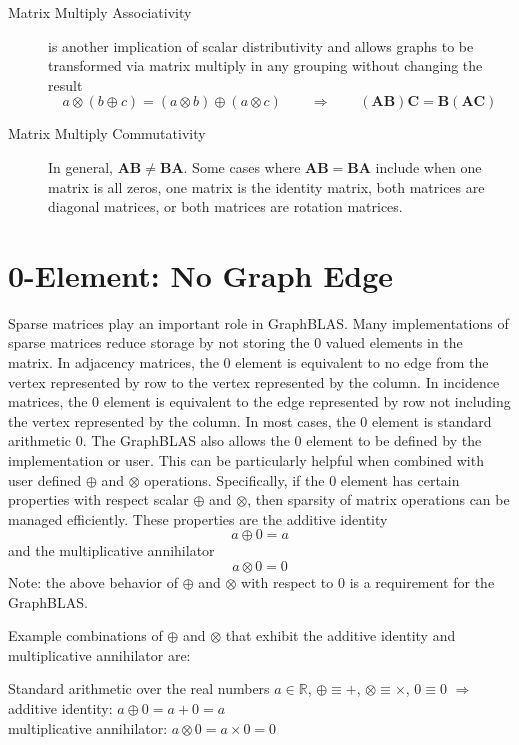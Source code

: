 \begin{description}
\item[Matrix Multiply Associativity] is another implication of scalar distributivity and allows graphs to be transformed via matrix multiply in any grouping without changing the result
  $$
      a \otimes (b \oplus c) = (a \otimes b) \oplus (a \otimes c)   ~~~~~~~~~ \Rightarrow ~~~~~~~~~
      (\mathbf{A} \mathbf{B}) \mathbf{C} = \mathbf{B} (\mathbf{A} \mathbf{C})
  $$
\item[Matrix Multiply Commutativity] In general, $\mathbf{A} \mathbf{B} \neq \mathbf{B} \mathbf{A}$.  Some cases where $\mathbf{A} \mathbf{B} = \mathbf{B} \mathbf{A}$ include when one matrix is all zeros, one matrix is the identity matrix, both matrices are diagonal matrices, or both matrices are rotation matrices.

\end{description}


\section{0-Element: No Graph Edge}
  Sparse matrices play an important role in GraphBLAS.  Many implementations of sparse matrices reduce storage by not storing the 0 valued elements in the matrix.  In adjacency matrices, the 0 element is equivalent to no edge from the vertex represented by row to the vertex represented by the column. In incidence matrices, the 0 element is equivalent to the edge represented by row not including the vertex represented by the column.  In most cases, the 0 element is standard arithmetic 0.  The GraphBLAS also allows the 0 element to be defined by the implementation or user.  This can be particularly helpful when combined with user defined $\oplus$ and $\otimes$ operations.  Specifically, if the 0 element has certain properties with respect scalar $\oplus$ and $\otimes$, then sparsity of matrix operations can be managed efficiently.  These properties are the additive identity
$$
     a \oplus 0 = a
$$
and the multiplicative annihilator
$$
     a \otimes 0 = 0
$$
Note: the above behavior of $\oplus$ and $\otimes$ with respect to 0 is a requirement for the GraphBLAS.

  Example combinations of $\oplus$ and $\otimes$ that exhibit the additive identity and multiplicative annihilator are:

Standard arithmetic over the real numbers $a \in \mathbb{R}$, 
$\oplus \equiv +$, $\otimes \equiv \times$, $0 \equiv 0$ $\Rightarrow$ \\
additive identity: $a \oplus 0  =  a + 0 = a$ \\
multiplicative annihilator: $a \otimes 0 = a \times 0 = 0$

